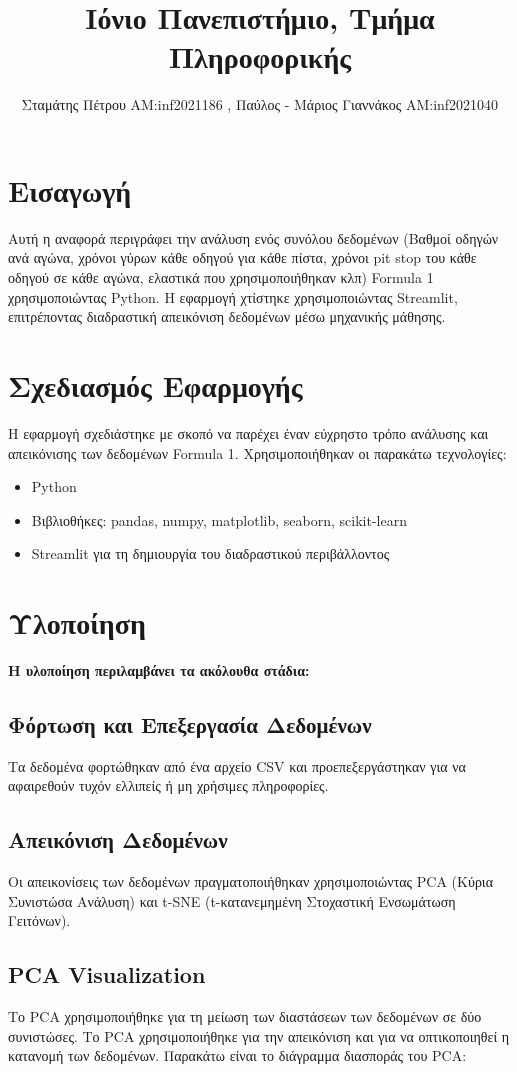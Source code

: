 \documentclass{article}
\title{Ιόνιο Πανεπιστήμιο, Τμήμα Πληροφορικής}
\author{Σταμάτης Πέτρου AM:inf2021186 , Παύλος - Μάριος Γιαννάκος AM:inf2021040}
\begin{document}
\maketitle

\section{Εισαγωγή}
Αυτή η αναφορά περιγράφει την ανάλυση ενός συνόλου δεδομένων (Βαθμοί οδηγών ανά αγώνα, χρόνοι γύρων κάθε οδηγού για κάθε πίστα, χρόνοι pit stop του κάθε οδηγού σε κάθε αγώνα, ελαστικά που χρησιμοποιήθηκαν κλπ) Formula 1 χρησιμοποιώντας Python. Η εφαρμογή χτίστηκε χρησιμοποιώντας Streamlit, επιτρέποντας διαδραστική απεικόνιση δεδομένων μέσω μηχανικής μάθησης.

\section{Σχεδιασμός Εφαρμογής}
Η εφαρμογή σχεδιάστηκε με σκοπό να παρέχει έναν εύχρηστο τρόπο ανάλυσης και απεικόνισης των δεδομένων Formula 1. Χρησιμοποιήθηκαν οι παρακάτω τεχνολογίες:
\begin{itemize}
    \item Python
    \item Βιβλιοθήκες: pandas, numpy, matplotlib, seaborn, scikit-learn
    \item Streamlit για τη δημιουργία του διαδραστικού περιβάλλοντος
\end{itemize}

\section{Υλοποίηση}
\textbf{Η υλοποίηση περιλαμβάνει τα ακόλουθα στάδια:}
\subsection{Φόρτωση και Επεξεργασία Δεδομένων}
Τα δεδομένα φορτώθηκαν από ένα αρχείο CSV και προεπεξεργάστηκαν για να αφαιρεθούν τυχόν ελλιπείς ή μη χρήσιμες πληροφορίες.

\subsection{Απεικόνιση Δεδομένων}
Οι απεικονίσεις των δεδομένων πραγματοποιήθηκαν χρησιμοποιώντας PCA (Κύρια Συνιστώσα Ανάλυση) και t-SNE (t-κατανεμημένη Στοχαστική Ενσωμάτωση Γειτόνων).

\subsection{PCA Visualization}
Το PCA χρησιμοποιήθηκε για τη μείωση των διαστάσεων των δεδομένων σε δύο συνιστώσες. Το PCA χρησιμοποιήθηκε για την απεικόνιση και για να οπτικοποιηθεί η κατανομή των δεδομένων. Παρακάτω είναι το διάγραμμα διασποράς του PCA:
\end{document}
